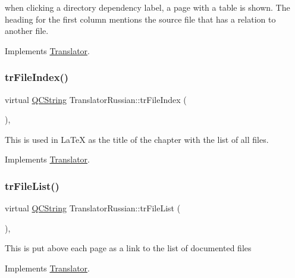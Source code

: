 when clicking a directory dependency label, a page with a table is shown. The heading for the first column mentions the source file that has a relation to another file. 

Implements \mbox{\hyperlink{class_translator}{Translator}}.

\mbox{\label{class_translator_russian_a83c5407d79420220cb5c04bb4d97b2cf}} 
\subsubsection{\texorpdfstring{trFileIndex()}{trFileIndex()}}
{\footnotesize\ttfamily virtual \mbox{\hyperlink{class_q_c_string}{Q\+C\+String}} Translator\+Russian\+::tr\+File\+Index (\begin{DoxyParamCaption}{ }\end{DoxyParamCaption})\hspace{0.3cm}{\ttfamily [inline]}, {\ttfamily [virtual]}}

This is used in La\+TeX as the title of the chapter with the list of all files. 

Implements \mbox{\hyperlink{class_translator}{Translator}}.

\mbox{\label{class_translator_russian_a9f1e0d04b414e5ffb3f41457073a4444}} 
\subsubsection{\texorpdfstring{trFileList()}{trFileList()}}
{\footnotesize\ttfamily virtual \mbox{\hyperlink{class_q_c_string}{Q\+C\+String}} Translator\+Russian\+::tr\+File\+List (\begin{DoxyParamCaption}{ }\end{DoxyParamCaption})\hspace{0.3cm}{\ttfamily [inline]}, {\ttfamily [virtual]}}

This is put above each page as a link to the list of documented files 

Implements \mbox{\hyperlink{class_translator}{Translator}}.

\mbox{\label{class_translator_russian_a64ef828c1457fd2ded1deaa47f726001}} 
